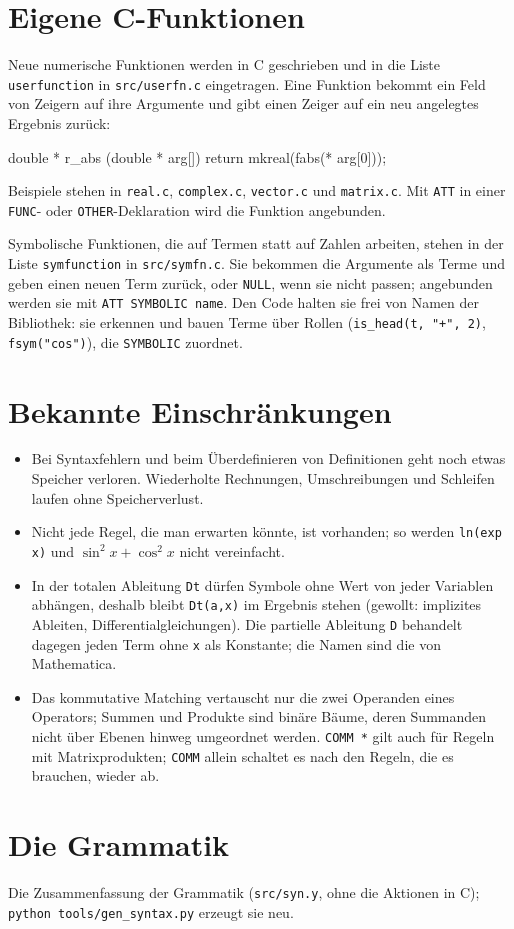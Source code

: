 \documentclass[a4paper,11pt]{article}
\newcommand{\kw}[1]{\texttt{#1}}
\begin{document}
\section{Eigene C-Funktionen}
Neue numerische Funktionen werden in C geschrieben und in die Liste
\kw{userfunction} in \kw{src/userfn.c} eingetragen. Eine Funktion bekommt
ein Feld von Zeigern auf ihre Argumente und gibt einen Zeiger auf ein neu
angelegtes Ergebnis zurück:
\begin{beispiel}
double * r_abs (double * arg[]) { return mkreal(fabs(* arg[0])); }
\end{beispiel}
Beispiele stehen in \kw{real.c}, \kw{complex.c}, \kw{vector.c} und
\kw{matrix.c}. Mit \kw{ATT} in einer \kw{FUNC}- oder
\kw{OTHER}-Deklaration wird die Funktion angebunden.

Symbolische Funktionen, die auf Termen statt auf Zahlen arbeiten, stehen
in der Liste \kw{symfunction} in \kw{src/symfn.c}. Sie bekommen die
Argumente als Terme und geben einen neuen Term zurück, oder \kw{NULL},
wenn sie nicht passen; angebunden werden sie mit \kw{ATT SYMBOLIC name}.
Den Code halten sie frei von Namen der Bibliothek: sie erkennen und bauen
Terme über Rollen (\kw{is\_head(t, "+", 2)}, \kw{fsym("cos")}), die
\kw{SYMBOLIC} zuordnet.

\section{Bekannte Einschränkungen}
\begin{itemize}
\item Bei Syntaxfehlern und beim Überdefinieren von Definitionen geht noch
  etwas Speicher verloren. Wiederholte Rechnungen, Umschreibungen und
  Schleifen laufen ohne Speicherverlust.
\item Nicht jede Regel, die man erwarten könnte, ist vorhanden; so werden
  \kw{ln(exp x)} und $\sin^2 x+\cos^2 x$ nicht vereinfacht.
\item In der totalen Ableitung \kw{Dt} dürfen Symbole ohne Wert von jeder
  Variablen abhängen, deshalb bleibt \kw{Dt(a,x)} im Ergebnis stehen
  (gewollt: implizites Ableiten, Differentialgleichungen). Die partielle
  Ableitung \kw{D} behandelt dagegen jeden Term ohne \kw{x} als Konstante;
  die Namen sind die von Mathematica.
\item Das kommutative Matching vertauscht nur die zwei Operanden eines
  Operators; Summen und Produkte sind binäre Bäume, deren Summanden nicht
  über Ebenen hinweg umgeordnet werden. \kw{COMM *} gilt auch für Regeln
  mit Matrixprodukten; \kw{COMM} allein schaltet es nach den Regeln, die
  es brauchen, wieder ab.
\end{itemize}

\appendix
\section{Die Grammatik}
Die Zusammenfassung der Grammatik (\kw{src/syn.y}, ohne die Aktionen in
C); \kw{python tools/gen\_syntax.py} erzeugt sie neu.
{\small }
\end{document}
